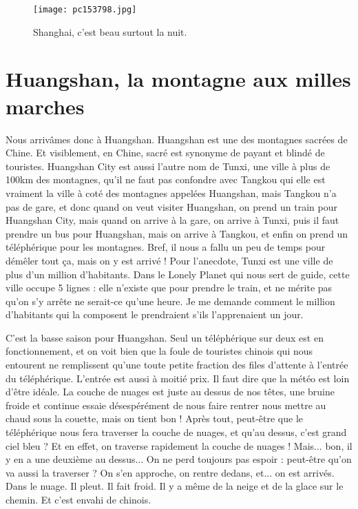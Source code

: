 \documentclass{book}
\begin{document}
\begin{figure}[h]
\centering
\texttt{[image: pc153798.jpg]}
\caption*{Shanghai, c'est beau surtout la nuit.}
\end{figure}



\chapter{Huangshan, la montagne aux milles marches}
Nous arrivâmes donc à Huangshan. Huangshan est une des montagnes sacrées de Chine. Et visiblement, en Chine, sacré est synonyme de payant et blindé de touristes. Huangshan City est aussi l'autre nom de Tunxi, une ville à plus de 100km des montagnes, qu'il ne faut pas confondre avec Tangkou qui elle est vraiment la ville à coté des montagnes appelées Huangshan, mais Tangkou n'a pas de gare, et donc quand on veut visiter Huangshan, on prend un train pour Huangshan City, mais quand on arrive à la gare, on arrive à Tunxi, puis il faut prendre un bus pour Huangshan, mais on arrive à Tangkou, et enfin on prend un téléphérique pour les montagnes. Bref, il nous a fallu un peu de temps pour démêler tout ça, mais on y est arrivé ! Pour l’anecdote, Tunxi est une ville de plus d'un million d'habitants. Dans le Lonely Planet qui nous sert de guide, cette ville occupe 5 lignes  : elle n'existe que pour prendre le train, et ne mérite pas qu'on s'y arrête ne serait-ce qu'une heure. Je me demande comment le million d'habitants qui la composent le prendraient s'ils l’apprenaient un jour.

C'est la basse saison pour Huangshan. Seul un téléphérique sur deux est en fonctionnement, et on voit bien que la foule de touristes chinois qui nous entourent ne remplissent qu'une toute petite fraction des files d'attente à l'entrée du téléphérique. L'entrée est aussi à moitié prix. Il faut dire que la météo est loin d'être idéale. La couche de nuages est juste au dessus de nos têtes, une bruine froide et continue essaie désespérément de nous faire rentrer nous mettre au chaud sous la couette, mais on tient bon ! Après tout, peut-être que le téléphérique nous fera traverser la couche de nuages, et qu'au dessus, c'est grand ciel bleu ? Et en effet, on traverse rapidement la couche de nuages ! Mais... bon, il y en a une deuxième au dessus... On ne perd toujours pas espoir : peut-être qu'on va aussi la traverser ? On s'en approche, on rentre dedans, et... on est arrivés. Dans le nuage. Il pleut. Il fait froid. Il y a même de la neige et de la glace sur le chemin. Et c'est envahi de chinois.
\end{document}
